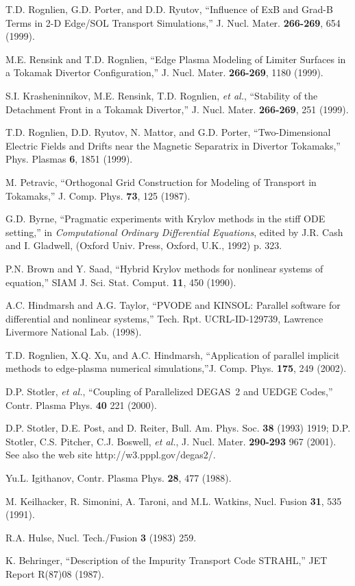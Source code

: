 \documentclass [12pt]{article}
\begin{document}
\begin{thebibliography}{99}
 T.D. Rognlien, G.D. Porter, and D.D. Ryutov, ``Influence of ExB
  and Grad-B Terms in 2-D Edge/SOL Transport Simulations,'' J. Nucl. Mater.
  {\bf 266-269}, 654 (1999).
  
 M.E. Rensink and T.D. Rognlien, ``Edge Plasma Modeling of
  Limiter Surfaces in a Tokamak Divertor Configuration,'' J. Nucl. Mater. {\bf
    266-269}, 1180 (1999).
  
 S.I. Krasheninnikov, M.E. Rensink, T.D. Rognlien, {\it et al.},
  ``Stability of the Detachment Front in a Tokamak Divertor,'' J. Nucl. Mater.
  {\bf 266-269}, 251 (1999).

 T.D. Rognlien, D.D. Ryutov, N. Mattor, and G.D. Porter,
  ``Two-Dimensional Electric Fields and Drifts near the Magnetic Separatrix in
  Divertor Tokamaks,'' Phys. Plasmas {\bf 6}, 1851 (1999).
  
 M. Petravic, ``Orthogonal Grid Construction for Modeling
  of Transport in Tokamaks,'' J. Comp. Phys. {\bf 73}, 125 (1987).

 G.D. Byrne, ``Pragmatic experiments with Krylov methods in
  the stiff ODE setting,'' in {\it Computational Ordinary Differential
    Equations}, edited by J.R. Cash and I. Gladwell, (Oxford Univ. Press,
  Oxford, U.K., 1992) p. 323.
  
 P.N. Brown and Y. Saad, ``Hybrid Krylov methods for
  nonlinear systems of equation,'' SIAM J. Sci. Stat. Comput. {\bf 11}, 450
  (1990).

 A.C. Hindmarsh and A.G. Taylor, ``{\sf PVODE} and {\sf
    KINSOL}: Parallel software for differential and nonlinear systems,'' Tech.
  Rpt. UCRL-ID-129739, Lawrence Livermore National Lab. (1998).
  
 T.D. Rognlien, X.Q. Xu, and A.C. Hindmarsh, ``Application of
  parallel implicit methods to edge-plasma numerical simulations,''J. Comp. Phys.
{\bf 175}, 249 (2002).
  
 D.P. Stotler, {\it et al.}, ``Coupling of Parallelized
  DEGAS~2 and UEDGE Codes,'' Contr. Plasma Phys. {\bf 40} 221 (2000).
  
 D.P. Stotler, D.E. Post, and D. Reiter, Bull. Am. Phys.  Soc.
  {\bf 38} (1993) 1919; D.P. Stotler, C.S. Pitcher, C.J. Boswell, {\it et
    al.}, J.  Nucl. Mater. {\bf 290-293} 967 (2001). See also the web site
  http://w3.pppl.gov/degas2/.

 Yu.L. Igithanov, Contr. Plasma Phys. {\bf 28}, 477 (1988).
  
 M. Keilhacker, R. Simonini, A. Taroni, and M.L. Watkins,
  Nucl. Fusion {\bf 31}, 535 (1991).

 R.A. Hulse, Nucl. Tech./Fusion {\bf 3} (1983) 259.
  
 K. Behringer, ``Description of the Impurity Transport Code
  STRAHL,'' JET Report R(87)08 (1987).

\end{thebibliography} 
\end{document}
